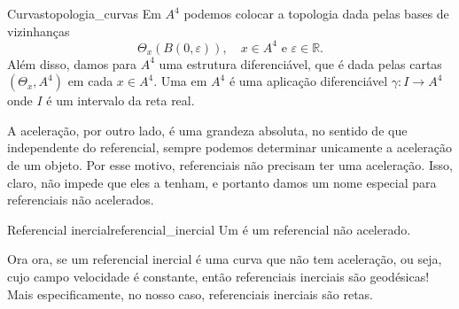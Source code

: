\documentclass[a4paper,12pt]{book}
\begin{document}
\begin{defi}{Curvas}{topologia_curvas}
  Em $A^4$ podemos colocar a topologia dada pelas bases de vizinhanças $$\Theta_x(B(0, \varepsilon)), \quad x \in A^4 \text{ e } \varepsilon \in \mathbb{R}.$$ Além disso, damos para $A^4$ uma estrutura diferenciável, que é dada pelas cartas $(\Theta_x, A^4)$ em cada $x \in A^4$. Uma  em $A^4$ é uma aplicação diferenciável $\gamma \colon I \to A^4$ onde $I$ é um intervalo da reta real.
\end{defi}

A aceleração, por outro lado, é uma grandeza absoluta, no sentido de que independente do referencial, sempre podemos determinar unicamente a aceleração de um objeto. Por esse motivo, referenciais não precisam ter uma aceleração. Isso, claro, não impede que eles a tenham, e portanto damos um nome especial para referenciais não acelerados.

\begin{defi}{Referencial inercial}{referencial_inercial}
  Um  é um referencial não acelerado.
\end{defi}

Ora ora, se um referencial inercial é uma curva que não tem aceleração, ou seja, cujo campo velocidade é constante, então referenciais inerciais são geodésicas! Mais especificamente, no nosso caso, referenciais inerciais são retas.
\end{document}
